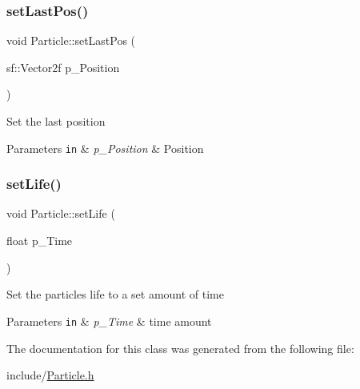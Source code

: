 \subsubsection{\texorpdfstring{set\+Last\+Pos()}{setLastPos()}}
{\footnotesize\ttfamily void Particle\+::set\+Last\+Pos (\begin{DoxyParamCaption}\item[{sf\+::\+Vector2f}]{p\+\_\+\+Position }\end{DoxyParamCaption})}

Set the last position 
\begin{DoxyParams}[1]{Parameters}
\mbox{\tt in}  & {\em p\+\_\+\+Position} & Position \\
\hline
\end{DoxyParams}
\mbox{\label{class_particle_a5a7e1ab519e58d9599cb6de75502f60f}} 
\subsubsection{\texorpdfstring{set\+Life()}{setLife()}}
{\footnotesize\ttfamily void Particle\+::set\+Life (\begin{DoxyParamCaption}\item[{float}]{p\+\_\+\+Time }\end{DoxyParamCaption})}

Set the particles life to a set amount of time 
\begin{DoxyParams}[1]{Parameters}
\mbox{\tt in}  & {\em p\+\_\+\+Time} & time amount \\
\hline
\end{DoxyParams}


The documentation for this class was generated from the following file\+:\begin{DoxyCompactItemize}
\item 
include/\hyperlink{_particle_8h}{Particle.\+h}\end{DoxyCompactItemize}
